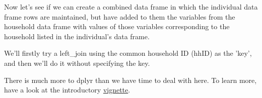 \documentclass[titlepage]{book}\usepackage{knitr}
\begin{document}
\begin{knitrout}
\color{fgcolor}\begin{kframe}
\begin{alltt}
\hlcom{#}
 \hlkwb{<-} \hlopt{:}
 \hlkwb{<-} \hlstd{(}\hlstd{,}\hlstd{,}\hlstd{,}\hlstd{,}\hlstd{,}\hlstd{,}\hlstd{,}\hlstd{,}\hlstd{,}\hlstd{,}\hlstd{,}\hlstd{,}\hlstd{,}\hlstd{,}\hlstd{)}
 \hlkwb{<-} \hlstd{LETTERS[}\hlopt{:}\hlstd{]}
 \hlkwb{<-} \hlstd{letters[}\hlopt{:}\hlstd{]}

 \hlkwb{<-} \hlstd{(} \hlstd{=} 
                   \hlstd{=} 
                   
                   
\end{alltt}
\end{kframe}
\end{knitrout}

Now let's see if we can create a combined data frame in which the individual data frame rows are maintained, but have added to them the variables from the household data frame with values of those variables corresponding to the household listed in the individual's data frame.

We'll firstly try a left\_join using the common household ID (hhID) as the 'key', and then we'll do it without specifying the key.

\begin{knitrout}
\color{fgcolor}\begin{kframe}
\begin{alltt}
 \hlkwb{<-}  \hlstd{=}\hlstd{)}
 \hlkwb{<-} 
\end{alltt}
\end{kframe}
\end{knitrout}

There is much more to dplyr than we have time to deal with here. To learn more, have a look at the introductory \href{cran.rstudio.com/web/packages/dplyr/vignettes/introduction.html}{vignette}.
\end{document}
